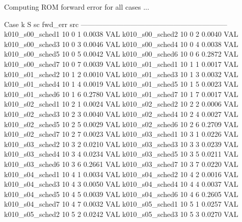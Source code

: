 Computing ROM forward error for all cases ...

Case                                 k    S  sc   fwd_err  src
--------------------------------------------------------------
  k010_s00_sched1                   10    0   1    0.0038  VAL
  k010_s00_sched2                   10    0   2    0.0040  VAL
  k010_s00_sched3                   10    0   3    0.0046  VAL
  k010_s00_sched4                   10    0   4    0.0038  VAL
  k010_s00_sched5                   10    0   5    0.0042  VAL
  k010_s00_sched6                   10    0   6    0.2872  VAL
  k010_s00_sched7                   10    0   7    0.0039  VAL
  k010_s01_sched1                   10    1   1    0.0017  VAL
  k010_s01_sched2                   10    1   2    0.0010  VAL
  k010_s01_sched3                   10    1   3    0.0032  VAL
  k010_s01_sched4                   10    1   4    0.0019  VAL
  k010_s01_sched5                   10    1   5    0.0023  VAL
  k010_s01_sched6                   10    1   6    0.2780  VAL
  k010_s01_sched7                   10    1   7    0.0017  VAL
  k010_s02_sched1                   10    2   1    0.0024  VAL
  k010_s02_sched2                   10    2   2    0.0006  VAL
  k010_s02_sched3                   10    2   3    0.0040  VAL
  k010_s02_sched4                   10    2   4    0.0027  VAL
  k010_s02_sched5                   10    2   5    0.0029  VAL
  k010_s02_sched6                   10    2   6    0.2709  VAL
  k010_s02_sched7                   10    2   7    0.0023  VAL
  k010_s03_sched1                   10    3   1    0.0226  VAL
  k010_s03_sched2                   10    3   2    0.0210  VAL
  k010_s03_sched3                   10    3   3    0.0239  VAL
  k010_s03_sched4                   10    3   4    0.0234  VAL
  k010_s03_sched5                   10    3   5    0.0211  VAL
  k010_s03_sched6                   10    3   6    0.2661  VAL
  k010_s03_sched7                   10    3   7    0.0220  VAL
  k010_s04_sched1                   10    4   1    0.0034  VAL
  k010_s04_sched2                   10    4   2    0.0016  VAL
  k010_s04_sched3                   10    4   3    0.0050  VAL
  k010_s04_sched4                   10    4   4    0.0037  VAL
  k010_s04_sched5                   10    4   5    0.0039  VAL
  k010_s04_sched6                   10    4   6    0.2605  VAL
  k010_s04_sched7                   10    4   7    0.0032  VAL
  k010_s05_sched1                   10    5   1    0.0257  VAL
  k010_s05_sched2                   10    5   2    0.0242  VAL
  k010_s05_sched3                   10    5   3    0.0270  VAL
